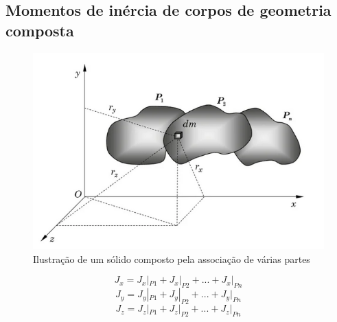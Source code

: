 \documentclass[a4paper, 12pt]{article}
\begin{document}
	\newpage
	\subsection{Momentos de inércia de corpos de geometria composta}
		\begin{figure}[h]
			\center
			\includegraphics[scale=0.5]{imagens/a3.png} 
			\caption{Ilustração de um sólido composto pela associação de várias partes}
		\end{figure}	
		\begin{equation}
			J_x = J_x|_{P1} + J_x|_{P2} + ... + J_x|_{Pn}
		\end{equation}
		\begin{equation}
			J_y = J_y|_{P1} + J_y|_{P2} + ... + J_y|_{Pn}
		\end{equation}
		\begin{equation}
			J_z = J_z|_{P1} + J_z|_{P2} + ... + J_z|_{Pn}
		\end{equation}
	
\end{document}
